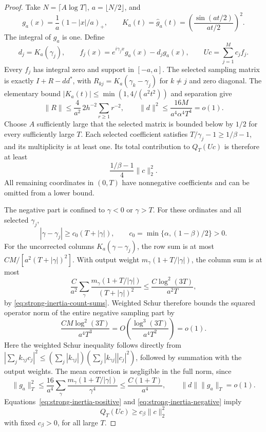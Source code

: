\begin{proof}
Take \(N=\lceil A\log T\rceil\), \(a=\lfloor N/2\rfloor\), and
\[
 g_a(x)=\frac1a(1-|x|/a)_+,
 \qquad
 K_a(t)=\widehat g_a(t)
       =\left(\frac{\sin(at/2)}{at/2}\right)^2.
\]
The integral of \(g_a\) is one. Define
\[
 d_j=K_a(\gamma_j),\qquad
 f_j(x)=e^{i\gamma_jx}g_a(x)-d_jg_a(x),\qquad
 Uc=\sum_{j=1}^M c_jf_j.
\]
Every \(f_j\) has integral zero and support in \([-a,a]\).
The selected sampling matrix is exactly \(I+R-dd^*\), with
\(R_{kj}=K_a(\gamma_k-\gamma_j)\) for \(k\ne j\) and zero diagonal.
The elementary bound
\(|K_a(t)|\le\min(1,4/(a^2t^2))\) and separation give
\[
 \|R\|\le\frac{4}{a^2}\,2h^{-2}\sum_{r\ge1}r^{-2},
 \qquad
 \|d\|^2\le\frac{16M}{a^4\alpha^4T^4}=o(1).
\]
Choose \(A\) sufficiently large that the selected matrix is bounded
below by \(1/2\) for every sufficiently large \(T\). Each selected
coefficient satisfies \(T/\gamma_j-1\ge1/\beta-1\), and its
multiplicity is at least one. Its total contribution to \(Q_T(Uc)\)
is therefore at least
\begin{equation}\label{eq:strong-inertia-positive}
 \frac{1/\beta-1}{4}\|c\|_2^2.
\end{equation}
All remaining coordinates in \((0,T)\) have nonnegative
coefficients and can be omitted from a lower bound.

The negative part is confined to \(\gamma<0\) or \(\gamma>T\).
For these ordinates and all selected \(\gamma_j\),
\[
 |\gamma-\gamma_j|\ge c_0(T+|\gamma|),
 \qquad c_0=\min\{\alpha,(1-\beta)/2\}>0.
\]
For the uncorrected columns \(K_a(\gamma-\gamma_j)\), the row sum
is at most \(CM/[a^2(T+|\gamma|)^2]\). With output weight
\(m_\gamma(1+T/|\gamma|)\), the column sum is at most
\[
 \frac C{a^2}\sum_\gamma
 \frac{m_\gamma(1+T/|\gamma|)}{(T+|\gamma|)^2}
       \le\frac{C\log^2(3T)}{a^2T},
\]
by \eqref{eq:strong-inertia-count-sums}. Weighted Schur therefore
bounds the squared operator norm of the entire negative sampling
part by
\begin{equation}\label{eq:strong-inertia-negative}
 \frac{CM\log^2(3T)}{a^4T^3}
       =O\left(\frac{\log^3(3T)}{a^4T^2}\right)=o(1).
\end{equation}
Here the weighted Schur inequality follows directly from
\(|\sum_j k_{\gamma j}c_j|^2
 \le(\sum_j|k_{\gamma j}|)
        (\sum_j|k_{\gamma j}||c_j|^2)\), followed by summation
with the output weights.
The mean correction is negligible in the full norm, since
\[
 \|g_a\|_T^2\le\frac{16}{a^4}
   \sum_\gamma\frac{m_\gamma(1+T/|\gamma|)}{\gamma^4}
      \le\frac{C(1+T)}{a^4},
 \qquad \|d\|\|g_a\|_T=o(1).
\]
Equations~\eqref{eq:strong-inertia-positive} and
\eqref{eq:strong-inertia-negative} imply
\begin{equation}\label{eq:strong-inertia-margin}
 Q_T(Uc)\ge c_\beta\|c\|_2^2
\end{equation}
with fixed \(c_\beta>0\), for all large \(T\).


\end{proof}
